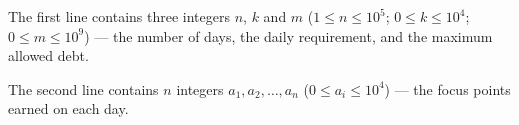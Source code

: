 The first line contains three integers $n$, $k$ and $m$ ($1 \le n \le 10^5$; $0 \le k \le 10^4$; $0 \le m \le 10^9$) --- the number of days, the daily requirement, and the maximum allowed debt.

The second line contains $n$ integers $a_1, a_2, \ldots, a_n$ ($0 \le a_i \le 10^4$) --- the focus points earned on each day.